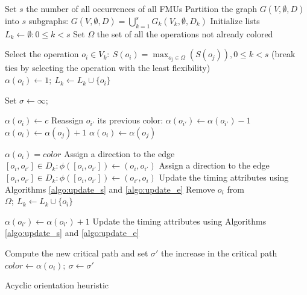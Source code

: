 \begin{algorithm}[!htp]
	Set $s$ the number of all occurrences of all FMUs\;
	Partition the graph $G(V,\emptyset,D)$ into $s$ subgraphs: $ G(V,\emptyset,D)= \bigcup_{k=1}^s G_k(V_k,\emptyset,D_k)$\;
	Initialize lists $L_k \leftarrow \emptyset: 0 \leq k < s$\;
	Set $\Omega$ the set of all the operations not already colored\;
	\While{$\Omega \neq \emptyset$}
	{
		Select the operation $o_i \in V_k:\ S(o_i) = \max_{o_j \in \Omega}(S(o_j)), 0 \leq k < s$ (break ties by selecting the operation with the least flexibility)\;
			{
				$\alpha(o_i) \leftarrow 1;\ L_k \leftarrow L_k \cup \{o_i\}$\;
			}
		\Else
		{
		Set $\sigma \leftarrow \infty$; 
		{
				{
			   {
					$\alpha(o_i) \leftarrow c$\;
					\;
							{
								Reassign $o_{i'}$ its previous color: $\alpha(o_{i'}) \leftarrow \alpha(o_{i'})-1$\;
							}
					}
				}
				{
					$\alpha(o_i) \leftarrow \alpha(o_j)+1$\;
					\;
				}
				\Else
				{
					$\alpha(o_i) \leftarrow \alpha(o_j)$\;
					\;
				}
			
			$\alpha(o_i)=color$\;
			{
				{
					Assign a direction to the edge $[o_i,o_{i'}] \in D_k: \phi([o_i,o_{i'}])\leftarrow (o_i,o_{i'})$\;
				}
				\Else
				{
					Assign a direction to the edge $[o_i,o_{i'}] \in D_k: \phi([o_i,o_{i'}])\leftarrow (o_{i'},o_i)$\;
				}
			}
			Update the timing attributes using Algorithms \ref{algo:update_s} and \ref{algo:update_e}\;
			Remove $o_i$ from $\Omega;\ L_k \leftarrow L_k \cup \{o_i\}$\;
		}
		}
	}
		{
						{
							
								$\alpha(o_{i'}) \leftarrow \alpha(o_{i'}) + 1$\;
								Update the timing attributes using Algorithms \ref{algo:update_s} and \ref{algo:update_e}\;
						}
						Compute the new critical path and set $\sigma'$ the increase in the critical path\;
							{
								$color \leftarrow \alpha(o_i);\ \sigma \leftarrow \sigma'$\;
							}
			 \KwRet\;
		}
 
	\caption{Acyclic orientation heuristic}
	\label{algo:ao}
\end{algorithm}

